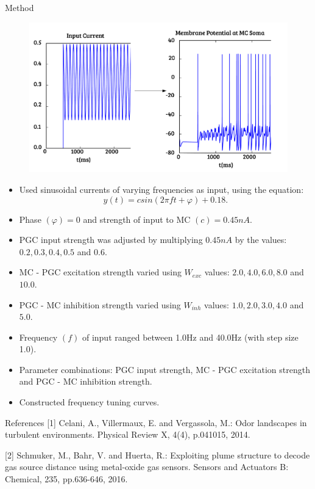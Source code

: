\documentclass[final,hyperref={pdfpagelabels=false}]{beamer}
\begin{document}
\begin{frame}{}
\begin{columns}[t]
\begin{column}{.48\linewidth}
\begin{block}{Method} 
\begin{figure}
\center
\includegraphics[scale=0.9]{images/Figure2}
\end{figure}
\begin{itemize}
\item Used sinusoidal currents of varying frequencies as input, using the equation:
\begin{equation}
y(t) = csin(2 \pi ft + \varphi) + 0.18. 
\end{equation}
\item Phase $(\varphi) = 0$ and strength of input to MC $(c) = 0.45nA$.
\item PGC input strength was adjusted by multiplying $0.45nA$ by the values: $0.2, 0.3, 0.4, 0.5$ and $0.6$.
\item MC - PGC excitation strength varied using $W_{exc}$ values: $2.0, 4.0, 6.0, 8.0$ and $10.0$.
\item PGC - MC inhibition strength varied using $W_{inh}$ values: $1.0, 2.0, 3.0, 4.0$ and $5.0$.
\item Frequency $(f)$ of input ranged between 1.0Hz and 40.0Hz (with step size 1.0).
\item Parameter combinations: PGC input strength, MC - PGC excitation strength and PGC - MC inhibition strength.
\item Constructed frequency tuning curves.
\end{itemize}
\end{block}

\begin{block}{References} 
\tiny{[1] Celani, A., Villermaux, E. and Vergassola, M.: Odor landscapes in turbulent environments. Physical Review X, 4(4), p.041015, 2014.}

\tiny{[2] Schmuker, M., Bahr, V. and Huerta, R.: Exploiting plume structure to decode gas source distance using metal-oxide gas sensors. Sensors and Actuators B: Chemical, 235, pp.636-646, 2016.}


\end{block}
\end{column}
\end{columns}
\end{frame}
\end{document}
